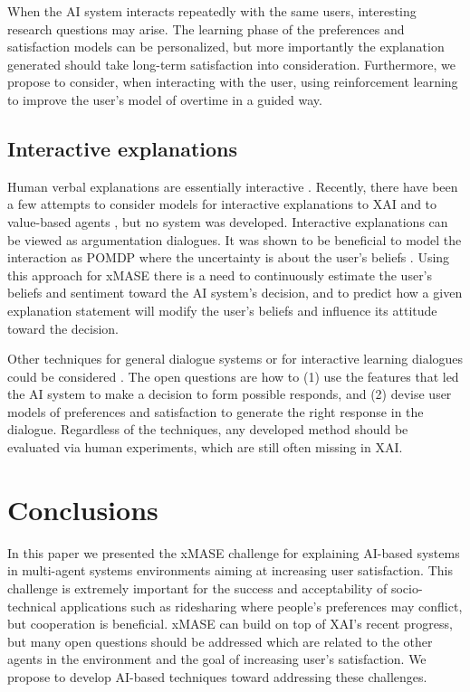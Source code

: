 \documentclass[letterpaper]{article} %
\begin{document}
When the AI system interacts repeatedly with the same users, interesting research questions may arise. The learning phase of the preferences and satisfaction models can be personalized, but more importantly the explanation generated should take long-term satisfaction into consideration.
Furthermore, we propose to consider, when interacting with the user, using reinforcement learning to improve the user's model of overtime in a guided way.
\subsection{Interactive explanations}   
Human verbal explanations are essentially interactive \cite{cawsey1993planning}.
Recently, there have been a few attempts to consider models for interactive explanations to XAI \cite{madumal2018towards}
and to value-based agents
\cite{liao2018representation}, but no system was developed. Interactive explanations can be viewed as argumentation dialogues. It was shown to be beneficial to model the interaction as POMDP where the uncertainty is about the user's beliefs \cite{rosenfeld2016strategical}.  Using this approach for xMASE there is a need to continuously estimate the user's beliefs and sentiment toward the AI system's decision, and to predict how a given explanation statement will modify the user's beliefs and influence its attitude toward the decision.

Other techniques for general dialogue systems or for interactive learning dialogues could be considered \cite{chen2017survey}. The open questions are how to (1) use the features that led the AI system to make a decision to form possible responds, and (2) devise user models of preferences and satisfaction to generate the right response in the dialogue. 
Regardless of the techniques, any developed method should be evaluated via human experiments, which are still often missing in XAI.
\section{Conclusions}
In this paper we presented the xMASE challenge for explaining AI-based systems in multi-agent systems environments aiming at increasing user satisfaction. This challenge is extremely important for the success and acceptability of socio-technical applications such as ridesharing where people's preferences may conflict, but cooperation is beneficial. xMASE can build on top of XAI's recent progress, but many open questions should be addressed which are related to the other agents in the environment and the goal of increasing user's satisfaction. We propose to develop AI-based techniques toward addressing these challenges.


\end{document}
